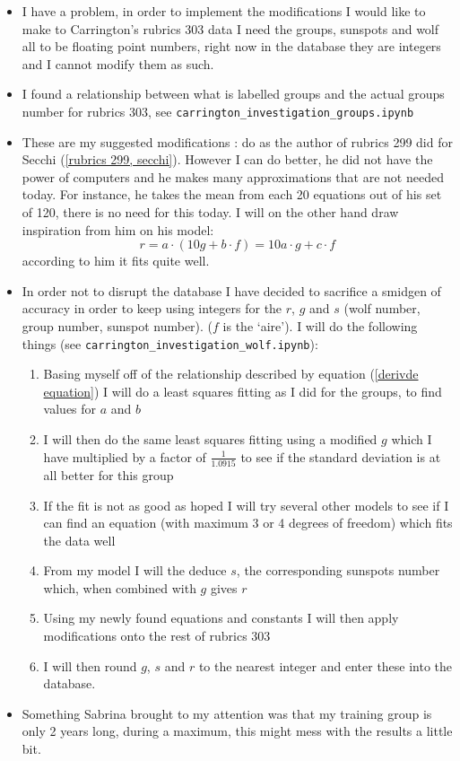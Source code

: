 \documentclass[12pt]{article}
\begin{document}
\begin{itemize}
\item I have a problem, in order to implement the modifications I would like to make to Carrington's rubrics 303 data I need the groups, sunspots and wolf all to be floating point numbers, right now in the database they are integers and I cannot modify them as such.
\item I found a relationship between what is labelled groups and the actual groups number for rubrics 303, see \texttt{carrington\_investigation\_groups.ipynb}
\item These are my suggested modifications : do as the author of rubrics 299 did for Secchi (\ref{rubrics 299, secchi}). However I can do better, he did not have the power of computers and he makes many approximations that are not needed today. For instance, he takes the mean from each 20 equations out of his set of 120, there is no need for this today. I will on the other hand draw inspiration from him on his model:
$$r = a\cdot(10 g + b\cdot f) = 10 a\cdot g + c\cdot f$$
according to him it fits quite well.
\item In order not to disrupt the database I have decided to sacrifice a smidgen of accuracy in order to keep using integers for the $r$, $g$ and $s$ (wolf number, group number, sunspot number). ($f$ is the `aire'). I will do the following things (see \texttt{carrington\_investigation\_wolf.ipynb}):
\begin{enumerate}
    \item Basing myself off of the relationship described by equation (\ref{derivde equation}) I will do a least squares fitting as I did for the groups, to find values for $a$ and $b$
    \item I will then do the same least squares fitting using a modified $g$ which I have multiplied by a factor of $\frac{1}{1.0915}$ to see if the standard deviation is at all better for this group
    \item If the fit is not as good as hoped I will try several other models to see if I can find an equation (with maximum 3 or 4 degrees of freedom) which fits the data well
    \item From my model I will the deduce $s$, the corresponding sunspots number which, when combined with $g$ gives $r$
    \item Using my newly found equations and constants I will then apply modifications onto the rest of rubrics 303
    \item I will then round $g$, $s$ and $r$ to the nearest integer and enter these into the database.
\end{enumerate}
\item Something Sabrina brought to my attention was that my training group is only 2 years long, during a maximum, this might mess with the results a little bit.
\end{itemize}
\end{document}
